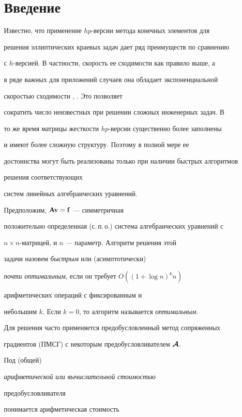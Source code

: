 \section*{Введение}


\label{intro} 





Известно, что применение $hp$-версии метода конечных элементов для 


решения эллиптических краевых задач дает ряд преимуществ по сравнению 


с $h$-версией. В частности, скорость ее сходимости как правило выше, а 


в ряде важных для приложений случаев она обладает экспоненциальной 


скоростью сходимости \cite{BS1987}, \cite{Schwab1998}. Это позволяет


сократить число неизвестных при решении сложных инженерных задач. В 


то же время матрицы жесткости $hp$-версии существенно более заполнены 


и имеют более сложную структуру. Поэтому в полной мере ее


достоинства могут быть реализованы только при наличии быстрых алгоритмов 


решения соответствующих


систем линейных алгебраических уравнений.





Предположим, $\bold {Av}={\bold f}$ --- симметричная


положительно определенная (с.\,п.\,о.) система алгебраических уравнений с


$n\times n$-матрицей, и $n$ --- параметр. Алгоритм решения этой


задачи назовем {\em быстрым} или (асимптотически)


{\em почти оптимальным}, если он требует $ O((1+\log n)^kn)$


арифметических операций с фиксированным и


небольшим $k$. Если $k=0$, то алгоритм называется {\em оптимальным}. 


Для решения часто применяется предобусловленный метод сопряженных 


градиентов (ПМСГ) с некоторым предобусловливателем $\boldsymbol{\cal {A}}$.


Под (общей) {\em арифметической или вычислительной стоимостью


предобусловливателя} понимается арифметическая стоимость


